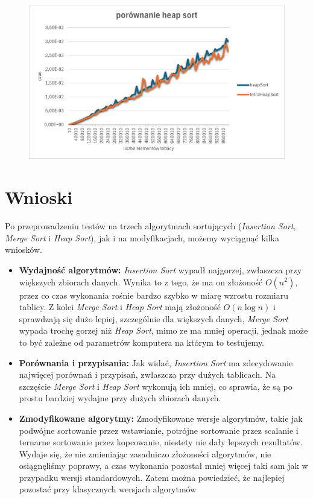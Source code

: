 \documentclass{article}
\begin{document}
	\begin{figure}[H]
		\centering
		\includegraphics[width=\textwidth]{heap.png}
	\end{figure}
	
	
	\section{Wnioski}
	
	Po przeprowadzeniu testów na trzech algorytmach sortujących (\textit{Insertion Sort}, \textit{Merge Sort} i \textit{Heap Sort}), jak i na modyfikacjach, możemy wyciągnąć kilka  wniosków.
	
	\begin{itemize}
		\item \textbf{Wydajność algorytmów:} \textit{Insertion Sort} wypadł najgorzej, zwłaszcza przy większych zbiorach danych. Wynika to z tego, że ma on złożoność $O(n^2)$, przez co czas wykonania rośnie bardzo szybko w miarę wzrostu rozmiaru tablicy. Z kolei \textit{Merge Sort} i \textit{Heap Sort} mają złożoność $O(n \log n)$ i sprawdzają się dużo lepiej, szczególnie dla większych danych, \textit{Merge Sort} wypada trochę gorzej niż \textit{Heap Sort}, mimo ze ma mniej operacji, jednak może to być zależne od parametrów komputera na którym to testujemy.
		
		\item \textbf{Porównania i przypisania:} Jak widać, \textit{Insertion Sort} ma zdecydowanie najwięcej porównań i przypisań, zwłaszcza przy dużych tablicach. Na szczęście \textit{Merge Sort} i \textit{Heap Sort} wykonują ich mniej, co sprawia, że są po prostu bardziej wydajne przy dużych zbiorach danych.
		
		\item \textbf{Zmodyfikowane algorytmy:} Zmodyfikowane wersje algorytmów, takie jak podwójne sortowanie przez wstawianie, potrójne sortowanie przez scalanie i ternarne sortowanie przez kopcowanie, niestety nie dały lepszych rezultatów. Wydaje się, że nie zmieniając zasadniczo złożoności algorytmów, nie osiągnęliśmy poprawy, a czas wykonania pozostał mniej więcej taki sam jak w przypadku wersji standardowych. Zatem można powiedzieć, że najlepiej pozostać przy klasycznych wersjach algorytmów\\
		
	\end{itemize}
	
\end{document}
